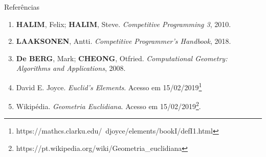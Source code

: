 \begin{frame}[fragile]{Referências}

    \begin{enumerate}
        \item \textbf{HALIM}, Felix; \textbf{HALIM}, Steve. \textit{Competitive Programming 3}, 2010.
        \item \textbf{LAAKSONEN}, Antti. \textit{Competitive Programmer's Handbook}, 2018.

        \item \textbf{De BERG}, Mark; \textbf{CHEONG}, Otfried. \textit{Computational Geometry: Algorithms and Applications}, 2008.

        \item David E. Joyce. \textit{Euclid's Elements}. Acesso em 15/02/2019\footnote{https://mathcs.clarku.edu/~djoyce/elements/bookI/defI1.html}

        \item Wikipédia. \textit{Geometria Euclidiana}. Acesso em 15/02/2019\footnote{https://pt.wikipedia.org/wiki/Geometria\_euclidiana}.

    \end{enumerate}

\end{frame}
